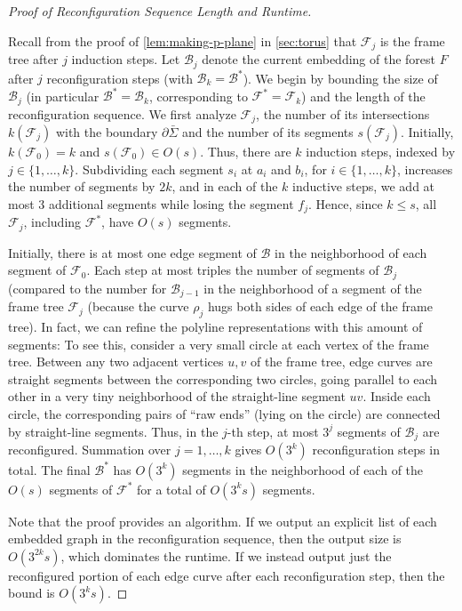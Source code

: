 \documentclass[a4paper,USenglish,cleveref,colorlinks=true,urlcolor=black,linkcolor=black,citecolor=black,thm-restate,authorcolumns]{lipics-v2021}
\theoremstyle{claimstyle}
\begin{document}

\lemmakingpplane*

\begin{proof}[Proof of Reconfiguration Sequence Length and Runtime]%
    \label{Plemmakingpplane}

    Recall from the proof of \cref{lem:making-p-plane} in \cref{sec:torus} that $\mathcal{F}_j$ is the frame tree after $j$ induction steps.
    Let $\mathcal{B}_j$ denote the current embedding of the forest $F$ after $j$ reconfiguration steps (with $\mathcal{B}_k = \mathcal{B}^*$).
    We begin by bounding the size of ${\mathcal B}_j$ (in particular ${\mathcal B}^* = \mathcal{B}_k$, corresponding to $\mathcal{F}^*=\mathcal{F}_k$) and the length of the reconfiguration sequence.
    We first analyze $\mathcal F_j$, the number of its intersections $k(\mathcal{F}_j)$ with the boundary $\partial\bar{\Sigma}$ and the number of its segments $s(\mathcal{F}_j)$.
    Initially, $k({\mathcal F_0}) = k$ and $s({\mathcal F_0}) \in O(s)$.
    Thus, there are $k$ induction steps, indexed by $j\in\{1,\ldots,k\}$. Subdividing each segment $s_i$ at $a_i$ and $b_i$, for $i\in\{1,\ldots,k\}$, increases the number of segments by $2k$, and in each of the $k$ inductive steps, we add at most $3$ additional segments while losing the segment $f_j$.
    Hence, since $k \le s$, all $\mathcal F_j$, including ${\mathcal F}^*$, have $O(s)$ segments.

    Initially, there is at most one edge segment of $\mathcal{B} $ in the neighborhood of each segment of $\mathcal{F}_{0}$.
    Each step at most triples the number of segments of $\mathcal{B}_j$ (compared to the number for $\mathcal{B}_{j-1}$ in the neighborhood of a segment of the frame tree  $\mathcal{F}_j$ (because the curve $\rho_j$ hugs both sides of each edge of the frame tree).
    In fact, we can refine the polyline representations with this amount of segments: To see this,  consider a very small circle at each vertex of the frame tree.
    Between any two adjacent vertices $u,v$ of the frame tree, edge curves are straight segments between the corresponding two circles, going parallel to each other in a very tiny neighborhood of the straight-line segment $uv$.
    Inside each circle, the corresponding pairs of ``raw ends'' (lying on the circle) are connected by straight-line segments.
    Thus, in the $j$-th step, at most $3^j$ segments of $\mathcal{B}_j$ are reconfigured.
    Summation over $j = 1, \ldots, k$ gives $O(3^k)$ reconfiguration steps in total.
    The final ${\mathcal B}^*$ has $O(3^k)$ segments in the neighborhood of each of the $O(s)$ segments of ${\mathcal F}^*$ for a total of $O(3^k s)$ segments.

    Note that the proof provides an algorithm.
    If we output an explicit list of each embedded graph in the reconfiguration sequence, then the output size is $O(3^{2k} s)$, which dominates the runtime.
    If we instead output just the reconfigured portion of each edge curve after each reconfiguration step, then the bound is $O(3^k s)$.
\end{proof}
\end{document}
